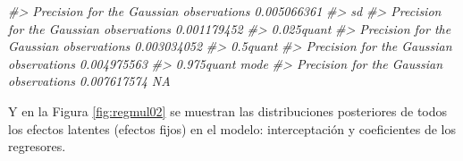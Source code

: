 \documentclass[
]{book}
\newenvironment{Shaded}{\begin{snugshade}}{\end{snugshade}}
\newcommand{\AttributeTok}[1]{\textcolor[rgb]{0.77,0.63,0.00}{#1}}
\newcommand{\CommentTok}[1]{\textcolor[rgb]{0.56,0.35,0.01}{\textit{#1}}}
\newcommand{\ControlFlowTok}[1]{\textcolor[rgb]{0.13,0.29,0.53}{\textbf{#1}}}
\newcommand{\DecValTok}[1]{\textcolor[rgb]{0.00,0.00,0.81}{#1}}
\newcommand{\FloatTok}[1]{\textcolor[rgb]{0.00,0.00,0.81}{#1}}
\newcommand{\FunctionTok}[1]{\textcolor[rgb]{0.00,0.00,0.00}{#1}}
\newcommand{\NormalTok}[1]{#1}
\newcommand{\OtherTok}[1]{\textcolor[rgb]{0.56,0.35,0.01}{#1}}
\newcommand{\SpecialCharTok}[1]{\textcolor[rgb]{0.00,0.00,0.00}{#1}}
\newcommand{\StringTok}[1]{\textcolor[rgb]{0.31,0.60,0.02}{#1}}
\begin{document}
\begin{Shaded}
\begin{Highlighting}[]
\CommentTok{\#\textgreater{} Precision for the Gaussian observations 0.005066361}
\CommentTok{\#\textgreater{}                                                  sd}
\CommentTok{\#\textgreater{} Precision for the Gaussian observations 0.001179452}
\CommentTok{\#\textgreater{}                                          0.025quant}
\CommentTok{\#\textgreater{} Precision for the Gaussian observations 0.003034052}
\CommentTok{\#\textgreater{}                                            0.5quant}
\CommentTok{\#\textgreater{} Precision for the Gaussian observations 0.004975563}
\CommentTok{\#\textgreater{}                                          0.975quant mode}
\CommentTok{\#\textgreater{} Precision for the Gaussian observations 0.007617574   NA}
\end{Highlighting}
\end{Shaded}

Y en la Figura \ref{fig:regmul02} se muestran las distribuciones posteriores de todos los efectos latentes (efectos fijos) en el modelo: interceptación y coeficientes de los regresores.

\begin{Shaded}
\end{Shaded}
\end{document}
